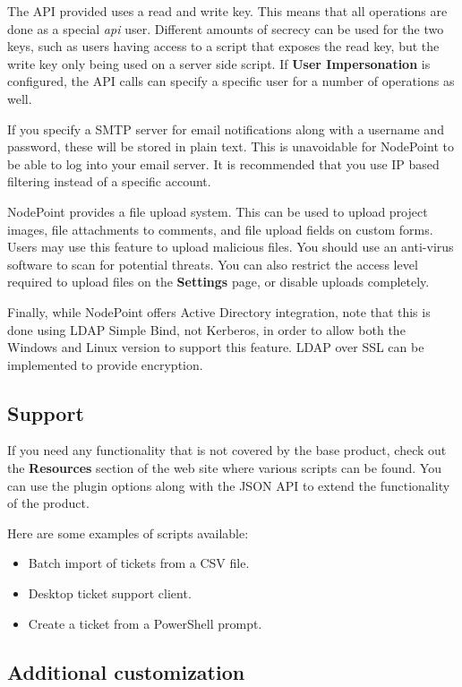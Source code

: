 \documentclass[11pt]{article}
\begin{document}
The API provided uses a read and write key. This means that all operations are done as a special \textit{api} user. Different amounts of secrecy can be used for the two keys, such as users having access to a script that exposes the read key, but the write key only being used on a server side script. If \textbf{User Impersonation} is configured, the API calls can specify a specific user for a number of operations as well.

If you specify a SMTP server for email notifications along with a username and password, these will be stored in plain text. This is unavoidable for NodePoint to be able to log into your email server. It is recommended that you use IP based filtering instead of a specific account.

NodePoint provides a file upload system. This can be used to upload project images, file attachments to comments, and file upload fields on custom forms. Users may use this feature to upload malicious files. You should use an anti-virus software to scan for potential threats. You can also restrict the access level required to upload files on the \textbf{Settings} page, or disable uploads completely.

Finally, while NodePoint offers Active Directory integration, note that this is done using LDAP Simple Bind, not Kerberos, in order to allow both the Windows and Linux version to support this feature. LDAP over SSL can be implemented to provide encryption.

\subsection{Support}
If you need any functionality that is not covered by the base product, check out the \textbf{Resources} section of the web site where various scripts can be found. You can use the plugin options along with the JSON API to extend the functionality of the product.

Here are some examples of scripts available:

\begin{itemize}
\item Batch import of tickets from a CSV file.
\item Desktop ticket support client.
\item Create a ticket from a PowerShell prompt.
\end{itemize}

\subsection{Additional customization}
\end{document}
